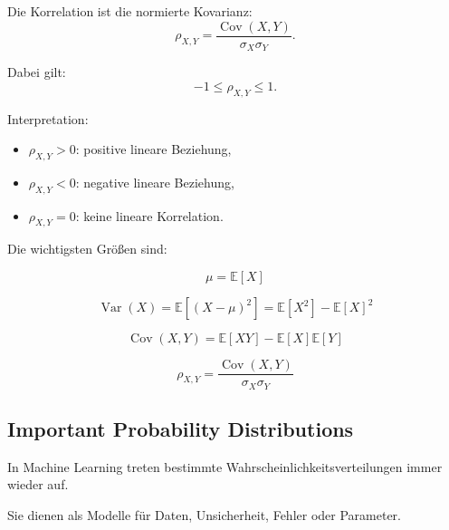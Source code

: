 \documentclass[11pt,a4paper]{scrartcl}
\begin{document}
\begin{calculationbox}
    Die Korrelation ist die normierte Kovarianz:
    \[
        \rho_{X,Y}
        =
        \frac{\operatorname{Cov}(X,Y)}
        {\sigma_X\sigma_Y}.
    \]

    Dabei gilt:
    \[
        -1 \leq \rho_{X,Y} \leq 1.
    \]

    Interpretation:
    \begin{itemize}
        \item \(\rho_{X,Y} > 0\): positive lineare Beziehung,
        \item \(\rho_{X,Y} < 0\): negative lineare Beziehung,
        \item \(\rho_{X,Y} = 0\): keine lineare Korrelation.
    \end{itemize}
\end{calculationbox}

\begin{answerbox}
    Die wichtigsten Größen sind:

    \[
        \boxed{
            \mu
            =
            \mathbb{E}[X]
        }
    \]

    \[
        \boxed{
            \operatorname{Var}(X)
            =
            \mathbb{E}\left[(X-\mu)^2\right]
            =
            \mathbb{E}[X^2] - \mathbb{E}[X]^2
        }
    \]

    \[
        \boxed{
            \operatorname{Cov}(X,Y)
            =
            \mathbb{E}[XY]
            -
            \mathbb{E}[X]\mathbb{E}[Y]
        }
    \]

    \[
        \boxed{
            \rho_{X,Y}
            =
            \frac{\operatorname{Cov}(X,Y)}
            {\sigma_X\sigma_Y}
        }
    \]
\end{answerbox}

\subsection{Important Probability Distributions}

\begin{notebox}
    In Machine Learning treten bestimmte Wahrscheinlichkeitsverteilungen immer
    wieder auf.

    Sie dienen als Modelle für Daten, Unsicherheit, Fehler oder Parameter.
\end{notebox}
\end{document}
